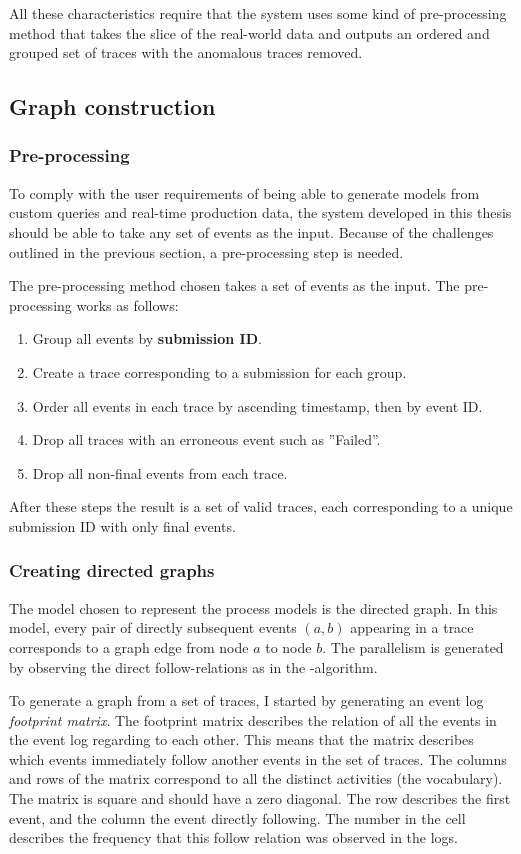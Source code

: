 \documentclass[english,12pt,a4paper,pdftex,sci,utf8]{aaltothesis}
\theoremstyle{definition}
\begin{document}
All these characteristics require that the system uses some kind of pre-processing method that takes the slice of the real-world data and outputs an ordered and grouped set of traces with the anomalous traces removed.

\subsection{Graph construction}

\subsubsection{Pre-processing}

To comply with the user requirements of being able to generate models from custom queries and real-time production data, the system developed in this thesis should be able to take any set of events as the input.
Because of the challenges outlined in the previous section, a pre-processing step is needed.

The pre-processing method chosen takes a set of events as the input. The pre-processing works as follows:
\begin{enumerate}
    \item Group all events by \textbf{submission ID}.
    \item Create a trace corresponding to a submission for each group.
    \item Order all events in each trace by ascending timestamp, then by event ID.
    \item Drop all traces with an erroneous event such as ''Failed''.
    \item Drop all non-final events from each trace.
\end{enumerate}
After these steps the result is a set of valid traces, each corresponding to a unique submission ID with only final events.

\subsubsection{Creating directed graphs}

The model chosen to represent the process models is the directed graph. 
In this model, every pair of directly subsequent events $(a,b)$ appearing in a trace corresponds to a 
graph edge from node $a$ to node $b$.
The parallelism is generated by observing the direct follow-relations as in the \textalpha-algorithm.

To generate a graph from a set of traces, I started by generating an event log \emph{footprint matrix}.
The footprint matrix describes the relation of all the events in the event log regarding to each other.
This means that the matrix describes which events immediately follow another events in the set of traces.
The columns and rows of the matrix correspond to all the distinct activities (the vocabulary).
The matrix is square and should have a zero diagonal.
The row describes the first event, and the column the event directly following.
The number in the cell describes the frequency that this follow relation was observed in the logs.
\end{document}
